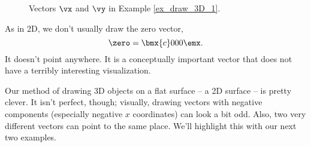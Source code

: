 {\begin{figure}[h!]
\begin{center}
\end{center}
\caption{Vectors $\protect\vx$ and $\protect\vy$ in Example \ref{ex_draw_3D_1}.}
\label{fig:draw_3D_vx_vy}
\end{figure}

} %

As in 2D, we don't usually draw the zero vector, $$\zero = \bmx{c}0\\0\\0\emx.$$ It doesn't point anywhere. It is a conceptually important vector that does not have a terribly interesting visualization.

Our method of drawing 3D objects on a flat surface -- a 2D surface -- is pretty clever. It isn't perfect, though; visually, drawing vectors with negative components (especially negative $x$ coordinates) can look a bit odd. Also, two very different vectors can point to the same place. We'll highlight this with our next two examples.\\

